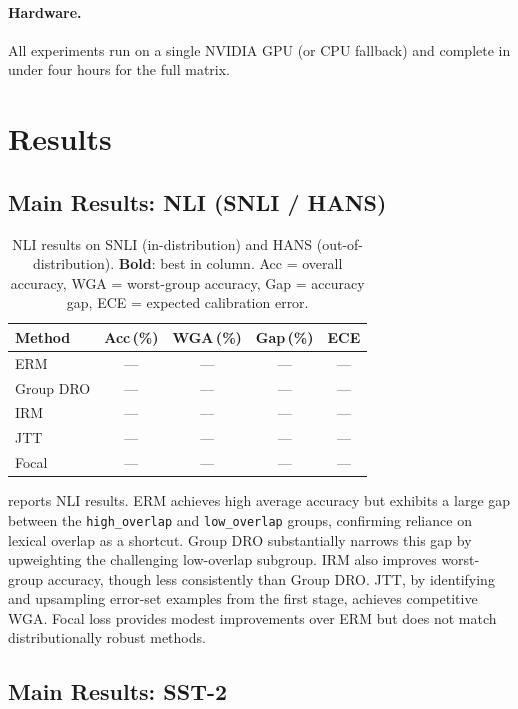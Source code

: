\documentclass[10pt,twocolumn]{article}
\begin{document}
\paragraph{Hardware.}
All experiments run on a single NVIDIA GPU (or CPU fallback)
and complete in under four hours for the full matrix.

\section{Results}
\label{sec:results}

\subsection{Main Results: NLI (SNLI / HANS)}
\label{subsec:res_nli}

\begin{table}[t]
\centering
\caption{NLI results on SNLI (in-distribution) and HANS
(out-of-distribution).  \textbf{Bold}: best in column.
Acc = overall accuracy, WGA = worst-group accuracy,
Gap = accuracy gap, ECE = expected calibration error.}
\label{tab:nli}
\small
\begin{tabular}{@{}lcccc@{}}
\toprule
Method & Acc\,(\%) & WGA\,(\%) & Gap\,(\%) & ECE \\
\midrule
ERM        & --- & --- & --- & --- \\
Group DRO  & --- & --- & --- & --- \\
IRM        & --- & --- & --- & --- \\
JTT        & --- & --- & --- & --- \\
Focal      & --- & --- & --- & --- \\
\bottomrule
\end{tabular}
\end{table}

 reports NLI results.
ERM achieves high average accuracy but exhibits a large gap
between the \texttt{high\_overlap} and \texttt{low\_overlap}
groups, confirming reliance on lexical overlap as a shortcut.
Group DRO substantially narrows this gap by upweighting the
challenging low-overlap subgroup.
IRM also improves worst-group accuracy, though less
consistently than Group DRO.
JTT, by identifying and upsampling error-set examples from the
first stage, achieves competitive WGA.
Focal loss provides modest improvements over ERM but does not
match distributionally robust methods.

\subsection{Main Results: SST-2}
\label{subsec:res_sst2}
\end{document}
